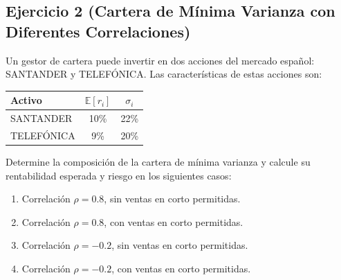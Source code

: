 \documentclass[12pt,a4paper]{article}
\newcommand{\E}{\mathbb{E}}
\newenvironment{ejercicio}[1]{\subsection*{Ejercicio #1}}{}
\begin{document}
\begin{ejercicio}{2 (Cartera de Mínima Varianza con Diferentes Correlaciones)}
Un gestor de cartera puede invertir en dos acciones del mercado español: SANTANDER y TELEFÓNICA. Las características de estas acciones son:
\begin{center}
\begin{tabular}{lcc}
\toprule
Activo & $\E[r_i]$ & $\sigma_i$ \\
\midrule
SANTANDER & 10\% & 22\% \\
TELEFÓNICA & 9\% & 20\% \\
\bottomrule
\end{tabular}
\end{center}

Determine la composición de la cartera de mínima varianza y calcule su rentabilidad esperada y riesgo en los siguientes casos:
\begin{enumerate}[label=\alph*)]
  \item Correlación $\rho = 0.8$, sin ventas en corto permitidas.
  \item Correlación $\rho = 0.8$, con ventas en corto permitidas.
  \item Correlación $\rho = -0.2$, sin ventas en corto permitidas.
  \item Correlación $\rho = -0.2$, con ventas en corto permitidas.
\end{enumerate}
\end{ejercicio}
\end{document}
